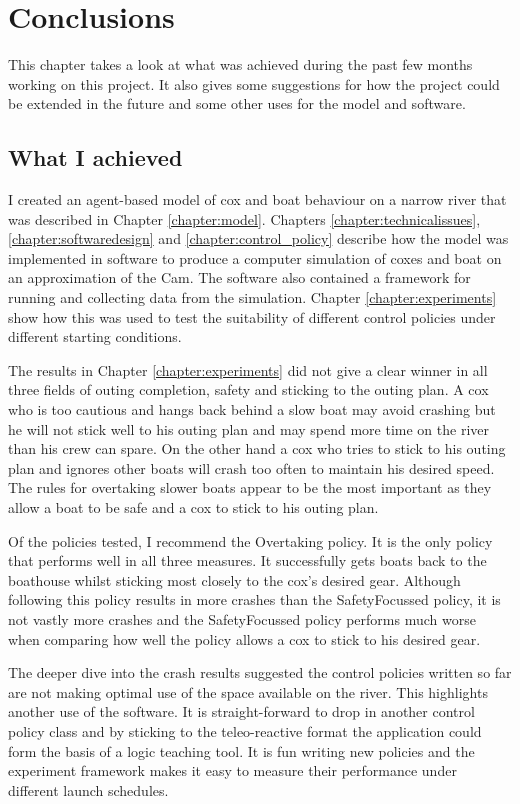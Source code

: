 \chapter{Conclusions}\label{chapter:conclusions}
  This chapter takes a look at what was achieved during the past few months working on this project. It also gives some suggestions for how the project could be extended in the future and some other uses for the model and software.
  
  \section{What I achieved}
  I created an agent-based model of cox and boat behaviour on a narrow river that was described in Chapter \ref{chapter:model}. Chapters \ref{chapter:technicalissues}, \ref{chapter:softwaredesign} and \ref{chapter:control_policy} describe how the model was implemented in software to produce a computer simulation of coxes and boat on an approximation of the Cam. The software also contained a framework for running and collecting data from the simulation. Chapter \ref{chapter:experiments} show how this was used to test the suitability of different control policies under different starting conditions.
  
  The results in Chapter \ref{chapter:experiments} did not give a clear winner in all three fields of outing completion, safety and sticking to the outing plan. A cox who is too cautious and hangs back behind a slow boat may avoid crashing but he will not stick well to his outing plan and may spend more time on the river than his crew can spare. On the other hand a cox who tries to stick to his outing plan and ignores other boats will crash too often to maintain his desired speed. The rules for overtaking slower boats appear to be the most important as they allow a boat to be safe and a cox to stick to his outing plan. 
  
  Of the policies tested, I recommend the Overtaking policy. It is the only policy that performs well in all three measures. It successfully gets boats back to the boathouse whilst sticking most closely to the cox's desired gear. Although following this policy results in more crashes than the SafetyFocussed policy, it is not vastly more crashes and the SafetyFocussed policy performs much worse when comparing how well the policy allows a cox to stick to his desired gear.
  
  The deeper dive into the crash results suggested the control policies written so far are not making optimal use of the space available on the river. This highlights another use of the software. It is straight-forward to drop in another control policy class and by sticking to the teleo-reactive format the application could form the basis of a logic teaching tool. It is fun writing new policies and the experiment framework makes it easy to measure their performance under different launch schedules.
  
